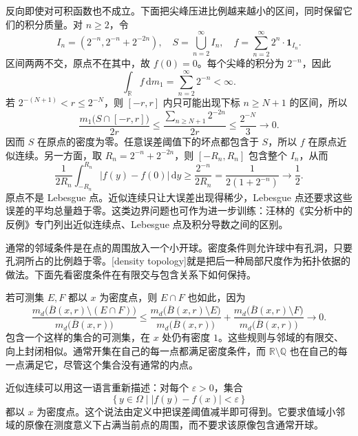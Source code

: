 反向即使对可积函数也不成立。下面把尖峰压进比例越来越小的区间，同时保留它们的积分质量。对 \(n\geq2\)，令
\[
I_n=(2^{-n},2^{-n}+2^{-2n}),
\quad
S=\bigcup_{n=2}^{\infty}I_n,
\quad
f=\sum_{n=2}^{\infty}2^n\cdot\mathbf1_{I_n}.
\]
区间两两不交，原点不在其中，故 \(f(0)=0\)。每个尖峰的积分为 \(2^{-n}\)，因此
\[
\int_{\mathbb R}f\,\mathrm dm_1=\sum_{n=2}^{\infty}2^{-n}<\infty.
\]
若 \(2^{-(N+1)}<r\leq2^{-N}\)，则 \([-r,r]\) 内只可能出现下标 \(n\geq N+1\) 的区间，所以
\[
\frac{m_1\bigl(S\cap[-r,r]\bigr)}{2r}
\leq\frac{\sum_{n\geq N+1}2^{-2n}}{2r}
\leq\frac{2^{-N}}{3}
\longrightarrow0.
\]
因而 \(S\) 在原点的密度为零。任意误差阈值下的坏点都包含于 \(S\)，所以 \(f\) 在原点近似连续。另一方面，取 \(R_n=2^{-n}+2^{-2n}\)，则 \([-R_n,R_n]\) 包含整个 \(I_n\)，从而
\[
\frac{1}{2R_n}\int_{-R_n}^{R_n}|f(y)-f(0)|\,\mathrm dy
\geq\frac{2^{-n}}{2R_n}
=\frac{1}{2(1+2^{-n})}
\longrightarrow\frac12.
\]
原点不是 Lebesgue 点。近似连续只让大误差出现得稀少，Lebesgue 点还要求这些误差的平均总量趋于零。这类边界问题也可作为进一步训练：汪林的《实分析中的反例》\cite[第九章, 第37--38项]{Wang2013Counterexamples}专门列出近似连续点、Lebesgue 点及积分导数之间的区别。


通常的邻域条件是在点的周围放入一个小开球。密度条件则允许球中有孔洞，只要孔洞所占的比例趋于零。[density topology]就是把后一种局部尺度作为拓扑依据的做法。下面先看密度条件在有限交与包含关系下如何保持。

\ProseParagraphBreak

若可测集 \(E,F\) 都以 \(x\) 为密度点，则 \(E\cap F\) 也如此，因为
\[
\frac{m_d\bigl(\overline B(x,r)\setminus(E\cap F)\bigr)}{m_d\bigl(\overline B(x,r)\bigr)}
\leq
\frac{m_d\bigl(\overline B(x,r)\setminus E\bigr)}{m_d\bigl(\overline B(x,r)\bigr)}
+\frac{m_d\bigl(\overline B(x,r)\setminus F\bigr)}{m_d\bigl(\overline B(x,r)\bigr)}
\longrightarrow0.
\]
包含一个这样的集合的可测集，在 \(x\) 处仍有密度 \(1\)。这些规则与邻域的有限交、向上封闭相似。通常开集在自己的每一点都满足密度条件，而 \(\mathbb R\setminus\mathbb Q\) 也在自己的每一点满足它，尽管这个集合没有通常的内点。

\ProseParagraphBreak

近似连续可以用这一语言重新描述：对每个 \(\varepsilon>0\)，集合
\[
\{\,y\in\Omega\mid |f(y)-f(x)|<\varepsilon\,\}
\]
都以 \(x\) 为密度点。这个说法由定义中把误差阈值减半即可得到。它要求值域小邻域的原像在测度意义下占满当前点的周围，而不要求该原像包含通常开球。

